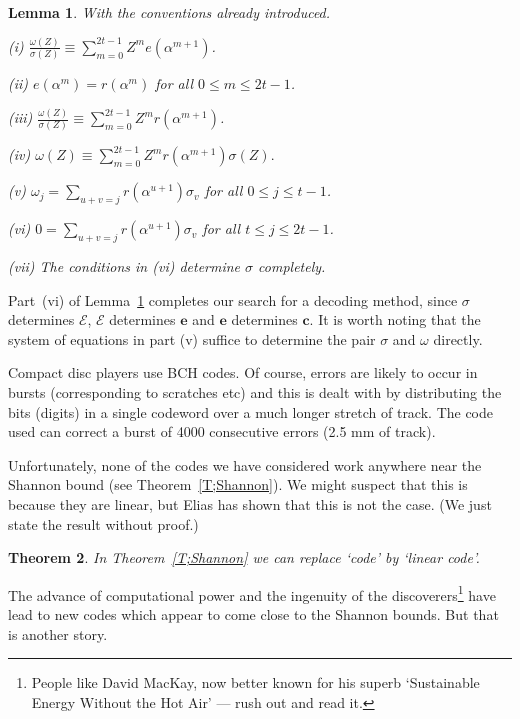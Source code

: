\documentclass[12pt,a4paper]{article}
\theoremstyle{plain}
\newtheorem{theorem}{Theorem}[section]
\newtheorem{lemma}[theorem]{Lemma}
\theoremstyle{definition}
\begin{document}
\begin{lemma}\label{BCH decode}
With the conventions already introduced.

(i) ${\displaystyle
\frac{\omega(Z)}{\sigma(Z)}\equiv
\sum_{m=0}^{2t-1}Z^{m}e(\alpha^{m+1})}$.

(ii) $e(\alpha^{m})=r(\alpha^{m})$ for all $0\leq m\leq 2t-1$.

(iii) ${\displaystyle
\frac{\omega(Z)}{\sigma(Z)}\equiv
\sum_{m=0}^{2t-1}Z^{m}r(\alpha^{m+1})}$.

(iv) $\omega(Z)\equiv\sum_{m=0}^{2t-1}Z^{m}r(\alpha^{m+1})
\sigma(Z).$

(v) ${\displaystyle 
\omega_{j}=\sum_{u+v=j}r(\alpha^{u+1})\sigma_{v}}$ for all
$0\leq j\leq t-1$.

(vi) ${\displaystyle 
0=\sum_{u+v=j}r(\alpha^{u+1})\sigma_{v}}$ for all $t\leq j\leq 2t-1$.

(vii) The conditions in (vi) determine $\sigma$ completely.
\end{lemma}
\noindent
Part~(vi) of Lemma~\ref{BCH decode} completes our search
for a decoding method, since $\sigma$ determines ${\mathcal E}$,
${\mathcal E}$ determines ${\mathbf e}$ and ${\mathbf e}$
determines ${\mathbf c}$. It is worth noting that
the system of equations in part (v) suffice to determine
the pair $\sigma$ and $\omega$ directly.

Compact disc players use BCH codes. Of course,  errors
are likely to occur in bursts (corresponding to
scratches etc) and this is dealt with by
distributing the bits (digits) in a single codeword
over a much longer stretch of track. The code used
can correct a burst of 4000 consecutive errors
(2.5 mm of track).


Unfortunately, none of the codes we have considered
work anywhere near the Shannon bound
(see Theorem~\ref{T;Shannon}). We might suspect
that this is because they are linear,
but Elias has shown that this is not the case.
(We just state the result without proof.)
\begin{theorem}
In  Theorem~\ref{T;Shannon}  we can replace `code'
by `linear code'.
\end{theorem}
\noindent

The advance of computational power and the 
ingenuity of the discoverers\footnote{People
like David MacKay, now better known for his
superb `Sustainable Energy Without the Hot Air'
--- rush out and read it.} have lead to
new codes which appear to come close to
the Shannon bounds. But that is another story.  
\end{document}
